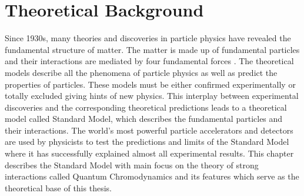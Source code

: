 \chapter{Theoretical Background}
\label{chap:Theory}
Since 1930s, many theories and discoveries in particle physics have revealed the fundamental structure of matter. The matter is made up of fundamental particles and their interactions are mediated by four fundamental forces \cite{Griffiths:111880}. The theoretical models describe all the phenomena of particle physics as well as predict the properties of particles. These models must be either confirmed experimentally or totally excluded giving hints of new physics. This interplay between experimental discoveries and the corresponding theoretical predictions leads to a theoretical model called Standard Model, which describes the fundamental particles and their interactions. The world's most powerful particle accelerators and detectors are used by physicists to test the predictions and limits of the Standard Model where it has successfully explained almost all experimental results. This chapter describes the Standard Model with main focus on the theory of strong interactions called Quantum Chromodynamics and its features which serve as the theoretical base of this thesis.

